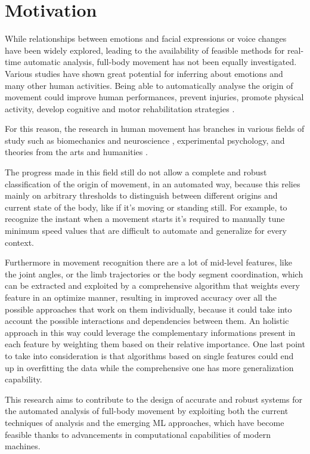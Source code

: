 \chapter{Motivation}

While relationships between emotions and facial expressions or voice changes have been widely explored, 
leading to the availability of feasible methods for real-time automatic analysis, 
full-body movement has not been equally investigated. 
Various studies have shown great potential for inferring about emotions and many other human activities. 
Being able to automatically analyse the origin of movement could improve human performances, 
prevent injuries, promote physical activity, develop cognitive and motor rehabilitation strategies \cite{piana:2016}. 

For this reason, the research in human movement has branches in various fields of study such as biomechanics and neuroscience \cite{vaessen:2019}, 
experimental psychology, and theories from the arts and humanities \cite{camurri:2016}. 

The progress made in this field still do not allow a complete and robust classification of the origin of movement, in an automated way, 
because this relies mainly on arbitrary thresholds to distinguish between different origins and current state of the body, 
like if it’s moving or standing still. 
For example, to recognize the instant when a movement starts it’s required to manually tune 
minimum speed values that are difficult to automate and generalize for every context. 

Furthermore in movement recognition there are a lot of mid-level features, like the joint angles, 
or the limb trajectories or the body segment coordination, which can be extracted and exploited by a comprehensive algorithm 
that weights every feature in an optimize manner, resulting in improved accuracy over all the possible approaches 
that work on them individually, because it could take into account the possible interactions and dependencies between them. 
An holistic approach in this way could leverage the complementary informations present in each feature by weighting them 
based on their relative importance. 
One last point to take into consideration is that algorithms based on single features could end up in overfitting the data
while the comprehensive one has more generalization capability. 

This research aims to contribute to the design of accurate and robust systems for the automated analysis of full-body movement
by exploiting both the current techniques of analysis and the emerging ML approaches, 
which have become feasible thanks to advancements in computational capabilities of modern machines. 


